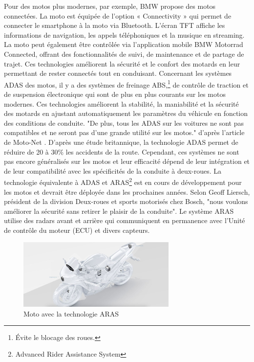 Pour des motos plus modernes, par exemple, BMW propose des motos connectées\cite{bmw_adas}. La moto est équipée de l’option « Connectivity » qui permet de connecter le smartphone à la moto via Bluetooth. L’écran TFT affiche les informations de navigation, les appels téléphoniques et la musique en streaming. La moto peut également être contrôlée via l’application mobile BMW Motorrad Connected, offrant des fonctionnalités de suivi, de maintenance et de partage de trajet. Ces technologies améliorent la sécurité et le confort des motards en leur permettant de rester connectés tout en conduisant.
Concernant les systèmes ADAS des motos\cite{moto_adas}, il y a des systèmes de freinage ABS,\footnote{Évite le blocage des roues.} de contrôle de traction et de suspension électronique qui sont de plus en plus courants sur les motos modernes. Ces technologies améliorent la stabilité, la maniabilité et la sécurité des motards en ajustant automatiquement les paramètres du véhicule en fonction des conditions de conduite. "De plus, tous les ADAS sur les voitures ne sont pas compatibles et ne seront pas d’une grande utilité sur les motos." d'après l'article de Moto-Net \cite{moto_adas}.
D'après une étude britannique, la technologie ADAS permet de réduire de 20 à 30\%\cite{moto_aras} les accidents de la route. Cependant, ces systèmes ne sont pas encore généralisés sur les motos et leur efficacité dépend de leur intégration et de leur compatibilité avec les spécificités de la conduite à deux-roues. La technologie équivalente à ADAS et ARAS\footnote{Advanced Rider Assistance System} est en cours de développement pour les motos et devrait être déployée dans les prochaines années.
Selon Geoff Liersch, président de la division Deux-roues et sports motorisés chez Bosch, "nous voulons améliorer la sécurité sans retirer le plaisir de la conduite"\cite{aras_bosh}.
Le système ARAS utilise des radars avant et arrière qui communiquent en permanence avec l’Unité de contrôle du moteur (ECU) et divers capteurs.

\begin{figure}[H]
    \centering
    \includegraphics[width=0.7\textwidth]{images/aras_moto.jpeg} 
    \caption{Moto avec la technologie ARAS}
\end{figure}

